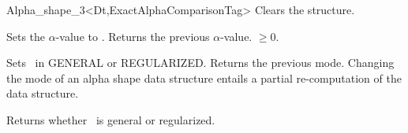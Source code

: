 \begin{ccRefClass} {Alpha_shape_3<Dt,ExactAlphaComparisonTag>}
{Clears the structure.}

{Sets the $\alpha$-value to .
 Returns the previous $\alpha$-value.
\ccPrecond {} $\geq 0$.}

{Sets \ccVar\ in GENERAL  or REGULARIZED. 
Returns the previous mode. 
Changing the mode of an alpha shape data structure
entails a partial re-computation of the data structure.}

% 
% 
% 






{Returns whether \ccVar\ is general or regularized.}


\end{ccRefClass}
